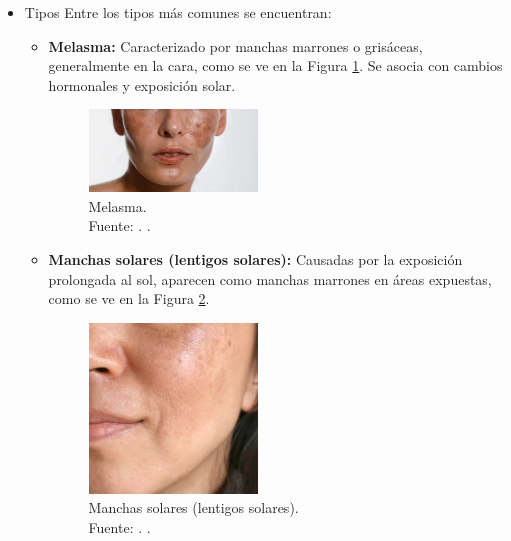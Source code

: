 \begin{itemize}
	\item Tipos
Entre los tipos más comunes se encuentran:
\begin{itemize}
\item \textbf{Melasma:} Caracterizado por manchas marrones o grisáceas, generalmente en la cara, como se ve en la Figura \ref{2:melasma}. Se asocia con cambios hormonales y exposición solar. \parencite{lee2024pigmentary}

\begin{figure}[H]
		\begin{center}
			\includegraphics[width=0.45\textwidth]{2/figures/melasma.png}
			\caption[Melasma]{Melasma.\\
			Fuente: \cite{consejosiml}. .}
			\label{2:melasma}
		\end{center}
	\end{figure}

\item \textbf{Manchas solares (lentigos solares):} Causadas por la exposición prolongada al sol, aparecen como manchas marrones en áreas expuestas, como se ve en la Figura \ref{2:mansol}. \parencite{lee2024pigmentary}

\begin{figure}[H]
		\begin{center}
			\includegraphics[width=0.45\textwidth]{2/figures/manchas solares.png}
			\caption[Manchas solares (lentigos solares)]{Manchas solares (lentigos solares).\\
			Fuente: \cite{eauthermaleavene}. .}
			\label{2:mansol}
		\end{center}
	\end{figure}


\end{itemize}
\end{itemize}
